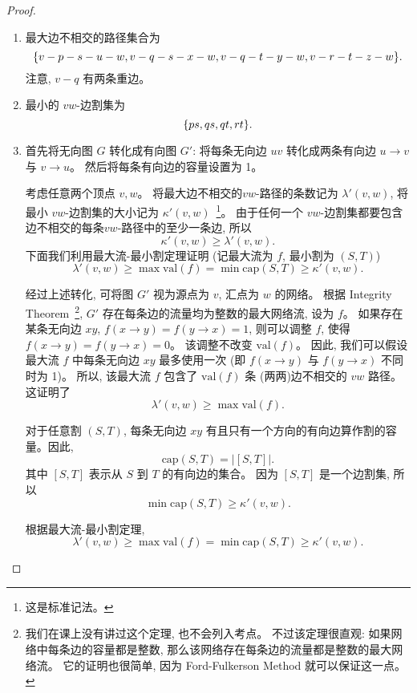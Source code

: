 \documentclass[a4paper, justified]{tufte-handout}
\begin{document}
\begin{proof}
  \begin{enumerate}[(1)]
    \item 最大边不相交的路径集合为
      \[
        \{v-p-s-u-w, v-q-s-x-w, v-q-t-y-w, v-r-t-z-w\}.
      \]
      注意, $v-q$ 有两条重边。
    \item 最小的 $vw$-边割集为
      \[
        \{ps, qs, qt, rt\}.
      \]
    \item 首先将无向图 $G$ 转化成有向图 $G'$:
      将每条无向边 $uv$ 转化成两条有向边 $u \to v$ 与 $v \to u$。
      然后将每条有向边的容量设置为 1。

      考虑任意两个顶点 $v, w$。
      将最大边不相交的$vw$-路径的条数记为 $\lambda'(v, w)$,
      将最小 $vw$-边割集的大小记为 $\kappa'(v, w)$~\footnote{这是标准记法。}。
      由于任何一个 $vw$-边割集都要包含边不相交的每条$vw$-路径中的至少一条边, 所以
      \[
        \kappa'(v, w) \ge \lambda'(v, w).
      \]
      下面我们利用最大流-最小割定理证明 (记最大流为 $f$, 最小割为 $(S, T)$)
      \[
        \lambda'(v, w) \ge \max \text{val}(f)
                       = \min \text{cap}(S, T)
                       \ge \kappa'(v, w).
      \]

      经过上述转化, 可将图 $G'$ 视为源点为 $v$, 汇点为 $w$ 的网络。
      根据 Integrity Theorem~\footnote{我们在课上没有讲过这个定理, 也不会列入考点。
      不过该定理很直观: 如果网络中每条边的容量都是整数,
      那么该网络存在每条边的流量都是整数的最大网络流。
      它的证明也很简单, 因为 Ford-Fulkerson Method 就可以保证这一点。},
      $G'$ 存在每条边的流量均为整数的最大网络流, 设为 $f$。
      如果存在某条无向边 $xy$, $f(x \to y) = f(y \to x) = 1$,
      则可以调整 $f$, 使得 $f(x \to y) = f(y \to x) = 0$。
      该调整不改变 $\text{val}(f)$。
      因此, 我们可以假设最大流 $f$ 中每条无向边 $xy$ 最多使用一次
      (即 $f(x \to y)$ 与 $f(y \to x)$ 不同时为 1)。
      所以, 该最大流 $f$ 包含了 $\text{val}(f)$ 条
      (两两)边不相交的 $vw$ 路径。这证明了
      \[
        \lambda'(v, w) \ge \max \text{val}(f).
      \]

      对于任意割 $(S, T)$,
      每条无向边 $xy$ 有且只有一个方向的有向边算作割的容量。因此,
      \[
        \text{cap}(S, T) = |[S, T]|.
      \]
      其中 $[S, T]$ 表示从 $S$ 到 $T$ 的有向边的集合。
      因为 $[S, T]$ 是一个边割集, 所以
      \[
        \min \text{cap}(S, T) \ge \kappa'(v, w).
      \]

      根据最大流-最小割定理,
      \[
        \lambda'(v, w) \ge \max \text{val}(f)
                       = \min \text{cap}(S, T)
                       \ge \kappa'(v, w).
      \]
  \end{enumerate}
\end{proof}
\end{document}
